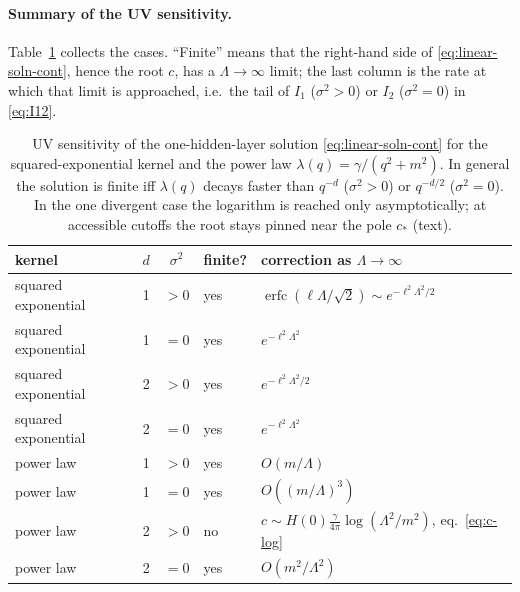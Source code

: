 \documentclass[11pt,a4paper]{article}
\newcommand{\Lam}{\Lambda}
\begin{document}
\paragraph{Summary of the UV sensitivity.}
Table~\ref{tab:uv} collects the cases. ``Finite'' means that the right-hand side of \eqref{eq:linear-soln-cont}, hence the root $c$, has a $\Lam\to\infty$ limit; the last column is the rate at which that limit is approached, i.e.\ the tail of $I_1$ ($\sigma^2>0$) or $I_2$ ($\sigma^2 = 0$) in \eqref{eq:I12}.
\begin{table}[t]
\centering\small
\begin{tabular}{l c c l l}
\toprule
kernel & $d$ & $\sigma^2$ & finite? & correction as $\Lam\to\infty$\\
\midrule
squared exponential & 1 & $>0$ & yes & $\operatorname{erfc}(\ell\Lam/\sqrt2)\sim e^{-\ell^2\Lam^2/2}$\\
squared exponential & 1 & $=0$ & yes & $e^{-\ell^2\Lam^2}$\\
squared exponential & 2 & $>0$ & yes & $e^{-\ell^2\Lam^2/2}$\\
squared exponential & 2 & $=0$ & yes & $e^{-\ell^2\Lam^2}$\\
power law & 1 & $>0$ & yes & $O(m/\Lam)$\\
power law & 1 & $=0$ & yes & $O((m/\Lam)^3)$\\
power law & 2 & $>0$ & no & $c\sim H(0)\frac{\gamma}{4\pi}\log(\Lam^2/m^2)$, eq.~\eqref{eq:c-log}\\
power law & 2 & $=0$ & yes & $O(m^2/\Lam^2)$\\
\bottomrule
\end{tabular}
\caption{UV sensitivity of the one-hidden-layer solution \eqref{eq:linear-soln-cont} for the squared-exponential kernel and the power law $\lambda(q) = \gamma/(q^2+m^2)$. In general the solution is finite iff $\lambda(q)$ decays faster than $q^{-d}$ ($\sigma^2>0$) or $q^{-d/2}$ ($\sigma^2 = 0$). In the one divergent case the logarithm is reached only asymptotically; at accessible cutoffs the root stays pinned near the pole $c_*$ (text).}
\label{tab:uv}
\end{table}
\end{document}
